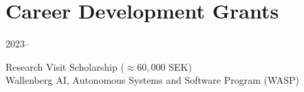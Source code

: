\section*{Career Development Grants}
\begin{labeling}{2023--}
    \item [2023] Research Visit Scholarship ($\approx 60{,}000$ SEK)\\
        Wallenberg AI, Autonomous Systems and Software Program (WASP)

\end{labeling}

